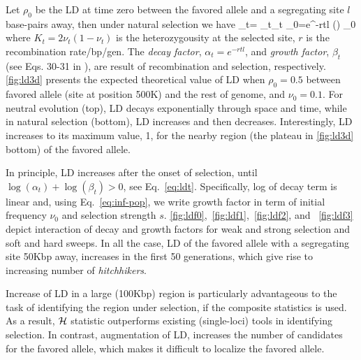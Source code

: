 Let $\rho_0$ be the LD at time zero between the favored allele and a 
segregating site $l$ base-pairs away, then under natural selection we have
\beq
\rho_t= \alpha_t\beta_t \rho_0=e^{-rtl} \left(\right)  
\rho_0\label{eq:ldt}
\eeq
where $K_t=2\nu_t(1-\nu_t)$ is the heterozygousity at the selected site, $r$ is 
the recombination rate/bp/gen. The 
\emph{decay factor}, $\alpha_t=e^{-rtl}$,
and \emph{growth factor}, $\beta_t$ (see Eqs. 30-31 in 
\cite{stephan2006hitchhiking}), are result of recombination and 
selection, respectively. \ref{fig:ld3d} presents the expected theoretical 
value of LD when $\rho_0=0.5$ between favored allele (site at position 500K) 
and the rest of 
genome, and $\nu_0=0.1$. For neutral evolution (top), LD decays exponentially 
through space and time, while in natural selection (bottom), LD increases and 
then decreases. Interestingly, LD increases to its maximum value, 1, for the 
nearby region (the plateau in \ref{fig:ld3d} bottom) of the favored 
allele.

In principle, LD increases after the onset of selection, until $\log(\alpha_t) 
+\log(\beta_t) 
>0$, see Eq.~\ref{eq:ldt}. 
Specifically, log of decay term is linear and, using 
Eq.~\ref{eq:inf-pop}, we write growth 
factor in term of initial frequency $\nu_0$ and selection strength $s$. 
\ref{fig:ldf0},~\ref{fig:ldf1},~\ref{fig:ldf2}, and ~\ref{fig:ldf3} 
depict interaction of 
decay and growth factors for weak and 
strong selection and soft and hard sweeps. In all the case, LD of the 
favored allele with a segregating site 50Kbp away, increases in the first 50 
generations, which give rise to increasing number of \emph{hitchhikers}. 

Increase of LD in a large (100Kbp) region is particularly advantageous to the 
task of identifying the region under selection, if the composite statistics is 
used. As a result, ${\cal H}$ statistic outperforms existing (single-loci) tools in 
identifying selection. In contrast, augmentation of LD, increases the 
number 
of candidates for 
the favored allele, which makes it difficult to localize the favored 
allele.
